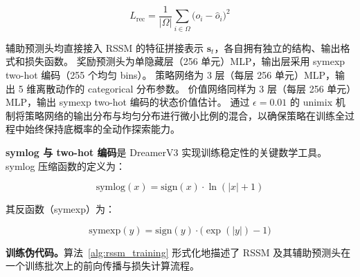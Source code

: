 \documentclass[12pt,a4paper]{ctexart}
\begin{document}
\begin{equation}
    L_{\text{rec}} = \frac{1}{|\Omega|} \sum_{i \in \Omega} \big(o_i - \hat{o}_i\big)^2
    \label{eq:rec_loss}
\end{equation}

辅助预测头均直接接入 RSSM 的特征拼接表示 $\mathbf{s}_t$，各自拥有独立的结构、输出格式和损失函数。
奖励预测头为单隐藏层（256 单元）MLP，输出层采用 symexp two-hot 编码（255 个均匀 bins）。
策略网络为 3 层（每层 256 单元）MLP，输出 5 维离散动作的 categorical 分布参数。
价值网络同样为 3 层（每层 256 单元）MLP，输出 symexp two-hot 编码的状态价值估计。
通过 $\epsilon = 0.01$ 的 unimix 机制将策略网络的输出分布与均匀分布进行微小比例的混合，以确保策略在训练全过程中始终保持底概率的全动作探索能力。

\textbf{symlog 与 two-hot 编码}是 DreamerV3 实现训练稳定性的关键数学工具。
symlog 压缩函数的定义为：

\begin{equation}
    \text{symlog}(x) = \text{sign}(x) \cdot \ln(|x| + 1)
    \label{eq:symlog}
\end{equation}

其反函数（symexp）为：

\begin{equation}
    \text{symexp}(y) = \text{sign}(y) \cdot \big(\exp(|y|) - 1\big)
    \label{eq:symexp}
\end{equation}

\textbf{训练伪代码。}算法~\ref{alg:rssm_training} 形式化地描述了 RSSM 及其辅助预测头在一个训练批次上的前向传播与损失计算流程。
\end{document}
